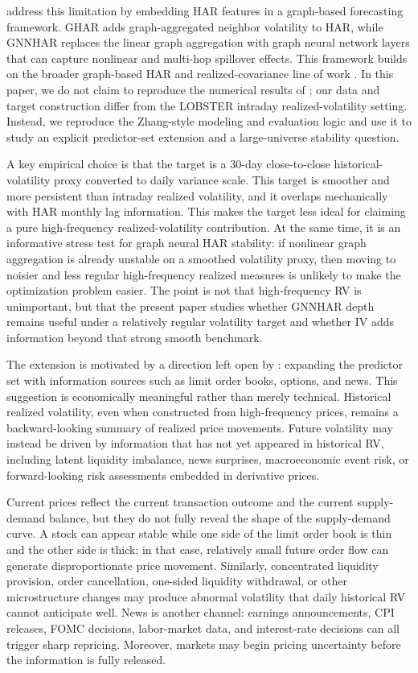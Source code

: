 \documentclass[11pt,a4paper]{article}
\begin{document}
\citet{zhang2025gnnhar} address this limitation by embedding HAR features in a graph-based forecasting framework.  GHAR adds graph-aggregated neighbor volatility to HAR, while GNNHAR replaces the linear graph aggregation with graph neural network layers that can capture nonlinear and multi-hop spillover effects.  This framework builds on the broader graph-based HAR and realized-covariance line of work \citep{zhang2024graphcovariance}.  In this paper, we do not claim to reproduce the numerical results of \citet{zhang2025gnnhar}; our data and target construction differ from the LOBSTER intraday realized-volatility setting.  Instead, we reproduce the Zhang-style modeling and evaluation logic and use it to study an explicit predictor-set extension and a large-universe stability question.

A key empirical choice is that the target is a 30-day close-to-close historical-volatility proxy converted to daily variance scale.  This target is smoother and more persistent than intraday realized volatility, and it overlaps mechanically with HAR monthly lag information.  This makes the target less ideal for claiming a pure high-frequency realized-volatility contribution.  At the same time, it is an informative stress test for graph neural HAR stability: if nonlinear graph aggregation is already unstable on a smoothed volatility proxy, then moving to noisier and less regular high-frequency realized measures is unlikely to make the optimization problem easier.  The point is not that high-frequency RV is unimportant, but that the present paper studies whether GNNHAR depth remains useful under a relatively regular volatility target and whether IV adds information beyond that strong smooth benchmark.

The extension is motivated by a direction left open by \citet{zhang2025gnnhar}: expanding the predictor set with information sources such as limit order books, options, and news.  This suggestion is economically meaningful rather than merely technical.  Historical realized volatility, even when constructed from high-frequency prices, remains a backward-looking summary of realized price movements.  Future volatility may instead be driven by information that has not yet appeared in historical RV, including latent liquidity imbalance, news surprises, macroeconomic event risk, or forward-looking risk assessments embedded in derivative prices.

Current prices reflect the current transaction outcome and the current supply-demand balance, but they do not fully reveal the shape of the supply-demand curve.  A stock can appear stable while one side of the limit order book is thin and the other side is thick; in that case, relatively small future order flow can generate disproportionate price movement.  Similarly, concentrated liquidity provision, order cancellation, one-sided liquidity withdrawal, or other microstructure changes may produce abnormal volatility that daily historical RV cannot anticipate well.  News is another channel: earnings announcements, CPI releases, FOMC decisions, labor-market data, and interest-rate decisions can all trigger sharp repricing.  Moreover, markets may begin pricing uncertainty before the information is fully released.
\end{document}
